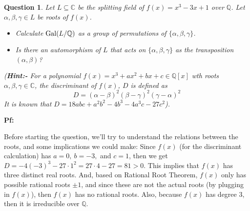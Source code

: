 \documentclass{article}
\newtheorem{question}{Question}
\newcommand{\QQ}{\mathbb{Q}}
\newcommand{\CC}{\mathbb{C}}
\newcommand{\Gal}{\textmd{Gal}}
\begin{document}
\section{}%
\begin{question}\label{q2}
    Let $L\subseteq\mathbb{C}$ be the splitting field of $f(x)=x^3-3x+1$ over $\mathbb{Q}$. Let $\alpha,\beta,\gamma\in L$ be roots of $f(x)$.
    \begin{itemize}
        \item[(a)] Calculate $\Gal(L/\QQ)$ as a group of permutations of $\{\alpha,\beta,\gamma\}$.
        \item[(b)] Is there an automorphism of $L$ that acts on $\{\alpha,\beta,\gamma\}$ as the transposition $(\alpha,\beta)$?
    \end{itemize}
    (\textbf{Hint:-} For a polynomial $f(x)=x^3+ax^2+bx+c\in\QQ[x]$ wth roots $\alpha,\beta,\gamma\in \CC$, the discriminant of $f(x)$, $D$ is defined as 
    $$D=(\alpha-\beta)^2(\beta-\gamma)^2(\gamma-\alpha)^2$$
    It is known that $D=18abc+a^2b^2-4b^3-4a^3c-27c^2$).
\end{question}

\textbf{Pf:}

Before starting the question, we'll try to understand the relations between the roots, and some implications we could make: Since $f(x)$ (for the discriminant calculation) has $a=0,\ b=-3,$ and $c=1$, then we get $D=-4(-3)^3-27\cdot 1^2 = 27\cdot 4-27 = 81>0$. This implies that $f(x)$ has three distinct real roots. And, based on Rational Root Theorem, $f(x)$ only has possible rational roots $\pm 1$, and since these are not the actual roots (by plugging in $f(x)$), then $f(x)$ has no rational roots. Also, because $f(x)$ has degree $3$, then it is irreducible over $\QQ$.
\end{document}
